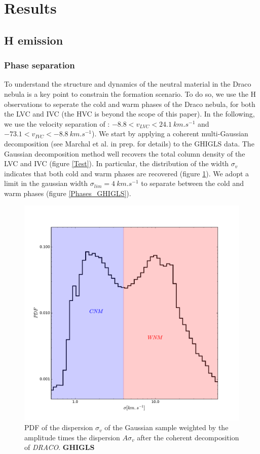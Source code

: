 \documentclass[traditabstract]{aa}
\begin{document}
\section{Results}
\label{sec:Res}

   \subsection{H emission}
   \label{sec:HI-data}

      \subsubsection{Phase separation}

   To understand the structure and dynamics of the neutral material in the Draco nebula is a key point to constrain the formation scenario. To do so, we use the H observations to seperate the cold and warm phases of the Draco nebula, for both the LVC and IVC (the HVC is beyond the scope of this paper). In the following, we use the velocity separation of \cite{Planck_XXIV_2011}: $-8.8<v_{LVC}<24.1\: km.s^{-1}$ and $-73.1<v_{IVC}<-8.8\: km.s^{-1}$).
We start by applying a coherent multi-Gaussian decomposition (see Marchal et al. in prep. for details) to the GHIGLS data. The Gaussian decomposition method well recovers the total column density of the LVC and IVC (figure \ref{Test}). In particular, the distribution of the width $\sigma_v$ indicates that both cold and warm phases are recovered (figure \ref{PDF_sigma}). We adopt a limit in the gaussian width $\sigma_{lim}=4\: km.s^{-1}$ to separate between the
cold and warm phases (figure \ref{Phases_GHIGLS}).

\begin{figure}
  \includegraphics[width=\linewidth]{Figures/PDF_sigma_over_A.pdf}
  \caption{\label{PDF_sigma} PDF of the dispersion $\sigma_v$ of the Gaussian sample weighted by the amplitude times the dispersion $A\sigma_v$ after the coherent decomposition of \textit{DRACO}. \textbf{GHIGLS}}
\end{figure}
\end{document}
